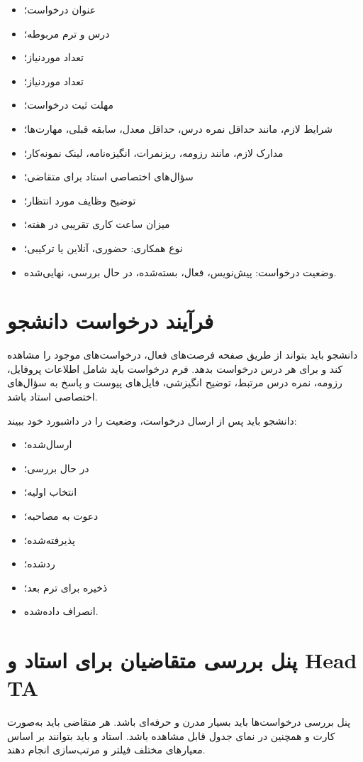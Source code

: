 \documentclass[12pt,a4paper]{article}
\begin{document}
\begin{itemize}
\item عنوان درخواست؛
\item درس و ترم مربوطه؛
\item تعداد  موردنیاز؛
\item تعداد  موردنیاز؛
\item مهلت ثبت درخواست؛
\item شرایط لازم، مانند حداقل نمره درس، حداقل معدل، سابقه قبلی، مهارت‌ها؛
\item مدارک لازم، مانند رزومه، ریزنمرات، انگیزه‌نامه، لینک نمونه‌کار؛
\item سؤال‌های اختصاصی استاد برای متقاضی؛
\item توضیح وظایف مورد انتظار؛
\item میزان ساعت کاری تقریبی در هفته؛
\item نوع همکاری: حضوری، آنلاین یا ترکیبی؛
\item وضعیت درخواست: پیش‌نویس، فعال، بسته‌شده، در حال بررسی، نهایی‌شده.
\end{itemize}

\section{فرآیند درخواست دانشجو}
دانشجو باید بتواند از طریق صفحه فرصت‌های فعال، درخواست‌های موجود را مشاهده کند و برای هر درس درخواست بدهد. فرم درخواست باید شامل اطلاعات پروفایل، رزومه، نمره درس مرتبط، توضیح انگیزشی، فایل‌های پیوست و پاسخ به سؤال‌های اختصاصی استاد باشد.

دانشجو باید پس از ارسال درخواست، وضعیت را در داشبورد خود ببیند:
\begin{itemize}
\item ارسال‌شده؛
\item در حال بررسی؛
\item انتخاب اولیه؛
\item دعوت به مصاحبه؛
\item پذیرفته‌شده؛
\item ردشده؛
\item ذخیره برای ترم بعد؛
\item انصراف داده‌شده.
\end{itemize}

\section{پنل بررسی متقاضیان برای استاد و Head TA}
پنل بررسی درخواست‌ها باید بسیار مدرن و حرفه‌ای باشد. هر متقاضی باید به‌صورت کارت و همچنین در نمای جدول قابل مشاهده باشد. استاد و  باید بتوانند بر اساس معیارهای مختلف فیلتر و مرتب‌سازی انجام دهند.
\end{document}
